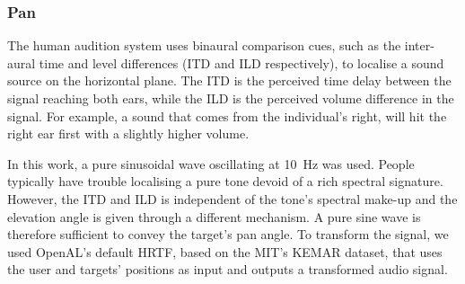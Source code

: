 \documentclass{llncs}
\begin{document}

\subsubsection{Pan}

The human audition system uses binaural comparison cues, such as the inter-aural time and level differences (ITD and ILD respectively), to localise a sound source on the horizontal plane.
The ITD is the perceived time delay between the signal reaching both ears, while the ILD is the perceived volume difference in the signal.
For example, a sound that comes from the individual's right, will hit the right ear first with a slightly higher volume.

In this work, a pure sinusoidal wave oscillating at \SI{10}{\hertz} was used. 
People typically have trouble localising a pure tone devoid of a rich spectral signature.
However, the ITD and ILD is independent of the tone's spectral make-up and the elevation angle is given through a different mechanism.
A pure sine wave is therefore sufficient to convey the target's pan angle.
To transform the signal, we used OpenAL's default HRTF, based on the MIT's KEMAR dataset\cite{hiebert2005openal,gardner1995hrtf}, that uses the user and targets' positions as input and outputs a transformed audio signal.

\end{document}

